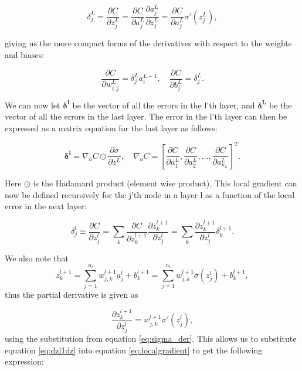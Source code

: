 \begin{equation*}
    \delta_j^L=  \frac{\partial C}{\partial z_j^L} = \frac{\partial C}{\partial a_j^L}\frac{\partial a_j^L}{\partial z_j^L} = \frac{\partial C}{\partial a_j^L}\sigma'(z_j^L),
\end{equation*}

giving us the more compact forms of the derivatives with respect to the weights and biases:

\begin{equation*}
    \frac{\partial C}{\partial w_{i,j}^L} = \delta_j^La_i^{L-1}, \quad \frac{\partial C}{\partial b_j^L} = \delta_j^L.
\end{equation*}

We can now let $\boldsymbol{\delta^l}$ be the vector of all the errors in the l'th layer, and $\boldsymbol{\delta^L}$ be the vector of all the errors in the last layer. 
The error in the l'th layer can then be expressed as a matrix equation for the last layer as follows:

\begin{equation*}
    \boldsymbol{\delta^l} = \nabla_aC \odot \frac{\partial \sigma}{\partial z^L}, \quad \nabla_aC = \left[\frac{\partial C}{\partial a_1^L}, \frac{\partial C}{\partial a_2^L}, ..., \frac{\partial C}{\partial a_{n_L}^L} \right]^T.
\end{equation*}

Here $\odot$ is the Hadamard product (element wise product). This local gradient can now be defined recursively for the j'th node in a layer l as a function of the local error in the next layer:

\begin{equation}
    \label{eq:localgradient}
    \delta_j^l \equiv \frac{\partial C}{\partial z_j^l} = \sum_k \frac{\partial C}{\partial z_k^{l+1}}\frac{\partial z_k^{l+1}}{\partial z_j^l} = \sum_k \frac{\partial z_k^{l+1}}{\partial z_j^l} \delta_k^{l+1}.
\end{equation}

We also note that 
\begin{equation*}
    z_k^{l+1} = \sum_{j=1}^{n_l} w_{j,k}^{l+1}a_j^l + b_k^{l+1} = \sum_{j=1}^{n_l} w_{j,k}^{l+1}\sigma(z_j^l) + b_k^{l+1},
\end{equation*} 
thus the partial derivative is given as 

\begin{equation}
    \label{eq:dzl1dz}
    \frac{\partial z_k^{l+1}}{\partial z_j^l} = w_{j,k}^{l+1}\sigma'(z_j^l), 
\end{equation}
using the substitution from equation \ref{eq:sigma_der}. This allows us to substitute equation \ref{eq:dzl1dz} into equation \ref{eq:localgradient} to get the following expression:

